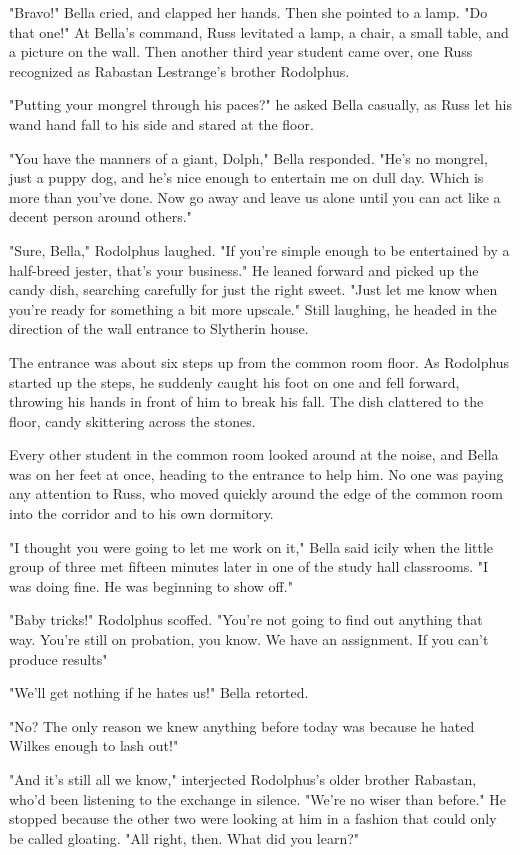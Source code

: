 "Bravo!" Bella cried, and clapped her hands. Then she pointed to a lamp. "Do that one!" At Bella's command, Russ levitated a lamp, a chair, a small table, and a picture on the wall. Then another third year student came over, one Russ recognized as Rabastan Lestrange's brother Rodolphus.

"Putting your mongrel through his paces?" he asked Bella casually, as Russ let his wand hand fall to his side and stared at the floor.

"You have the manners of a giant, Dolph," Bella responded. "He's no mongrel, just a puppy dog, and he's nice enough to entertain me on dull day. Which is more than you've done. Now go away and leave us alone until you can act like a decent person around others."

"Sure, Bella," Rodolphus laughed. "If you're simple enough to be entertained by a half-breed jester, that's your business." He leaned forward and picked up the candy dish, searching carefully for just the right sweet. "Just let me know when you're ready for something a bit more upscale." Still laughing, he headed in the direction of the wall entrance to Slytherin house.

The entrance was about six steps up from the common room floor. As Rodolphus started up the steps, he suddenly caught his foot on one and fell forward, throwing his hands in front of him to break his fall. The dish clattered to the floor, candy skittering across the stones.

Every other student in the common room looked around at the noise, and Bella was on her feet at once, heading to the entrance to help him. No one was paying any attention to Russ, who moved quickly around the edge of the common room into the corridor and to his own dormitory.

"I thought you were going to let me work on it," Bella said icily when the little group of three met fifteen minutes later in one of the study hall classrooms. "I was doing fine. He was beginning to show off."

"Baby tricks!" Rodolphus scoffed. "You're not going to find out anything that way. You're still on probation, you know. We have an assignment. If you can't produce results{\el}"

"We'll get nothing if he hates us!" Bella retorted.

"No? The only reason we knew anything before today was because he hated Wilkes enough to lash out!"

"And it's still all we know," interjected Rodolphus's older brother Rabastan, who'd been listening to the exchange in silence. "We're no wiser than before." He stopped because the other two were looking at him in a fashion that could only be called gloating. "All right, then. What did you learn?"

